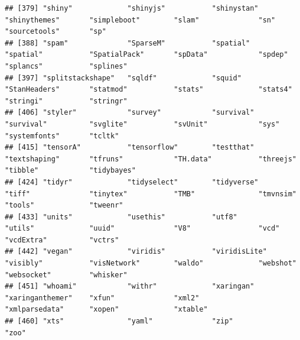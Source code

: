 \documentclass[
  12pt,
]{book}
\begin{document}
\begin{verbatim}
## [379] "shiny"             "shinyjs"           "shinystan"         "shinythemes"       "simpleboot"        "slam"              "sn"                "sourcetools"       "sp"               
## [388] "spam"              "SparseM"           "spatial"           "spatial"           "SpatialPack"       "spData"            "spdep"             "splancs"           "splines"          
## [397] "splitstackshape"   "sqldf"             "squid"             "StanHeaders"       "statmod"           "stats"             "stats4"            "stringi"           "stringr"          
## [406] "styler"            "survey"            "survival"          "survival"          "svglite"           "svUnit"            "sys"               "systemfonts"       "tcltk"            
## [415] "tensorA"           "tensorflow"        "testthat"          "textshaping"       "tfruns"            "TH.data"           "threejs"           "tibble"            "tidybayes"        
## [424] "tidyr"             "tidyselect"        "tidyverse"         "tiff"              "tinytex"           "TMB"               "tmvnsim"           "tools"             "tweenr"           
## [433] "units"             "usethis"           "utf8"              "utils"             "uuid"              "V8"                "vcd"               "vcdExtra"          "vctrs"            
## [442] "vegan"             "viridis"           "viridisLite"       "visibly"           "visNetwork"        "waldo"             "webshot"           "websocket"         "whisker"          
## [451] "whoami"            "withr"             "xaringan"          "xaringanthemer"    "xfun"              "xml2"              "xmlparsedata"      "xopen"             "xtable"           
## [460] "xts"               "yaml"              "zip"               "zoo"
\end{verbatim}

\backmatter

  

\printindex
\end{document}
